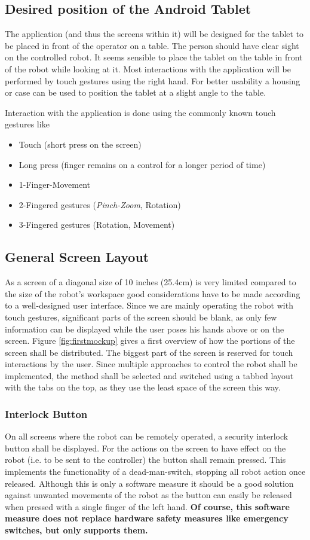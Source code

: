 \subsection{Desired position of the Android Tablet}
The application (and thus the screens within it) will be designed for the tablet to be placed in front of the operator on a table. The person should have clear sight on the controlled robot. It seems sensible to place the tablet on the table in front of the robot while looking at it. Most interactions with the application will be performed by touch gestures using the right hand. For better usability a housing or case can be used to position the tablet at a slight angle to the table. 


Interaction with the application is done using the commonly known touch gestures like
\begin{itemize}
	\item Touch (short press on the screen)
	\item Long press (finger remains on a control for a longer period of time)
	\item 1-Finger-Movement
	\item 2-Fingered gestures (\textit{Pinch-Zoom}, Rotation)
	\item 3-Fingered gestures (Rotation, Movement)
\end{itemize}

\subsection{General Screen Layout}
\label{sec:ui:layout}
As a screen of a diagonal size of 10 inches (25.4cm) is very limited compared to the size of the robot's workspace good considerations have to be made according to a well-designed user interface. Since we are mainly operating the robot with touch gestures, significant parts of the screen should be blank, as only few information can be displayed while the user poses his hands above or on the screen. Figure \ref{fig:firstmockup} gives a first overview of how the portions of the screen shall be distributed. The biggest part of the screen is reserved for touch interactions by the user. Since multiple approaches to control the robot shall be implemented, the method shall be selected and switched using a tabbed layout with the tabs on the top, as they use the least space of the screen this way.

\subsubsection{Interlock Button}
On all screens where the robot can be remotely operated, a security interlock button shall be displayed. For the actions on the screen to have effect on the robot (i.e. to be sent to the controller) the button shall remain pressed. This implements the functionality of a dead-man-switch, stopping all robot action once released. Although this is only a software measure it should be a good solution against unwanted movements of the robot as the button can easily be released when pressed with a single finger of the left hand. \textbf{Of course, this software measure does not replace hardware safety measures like emergency switches, but only supports them.}

